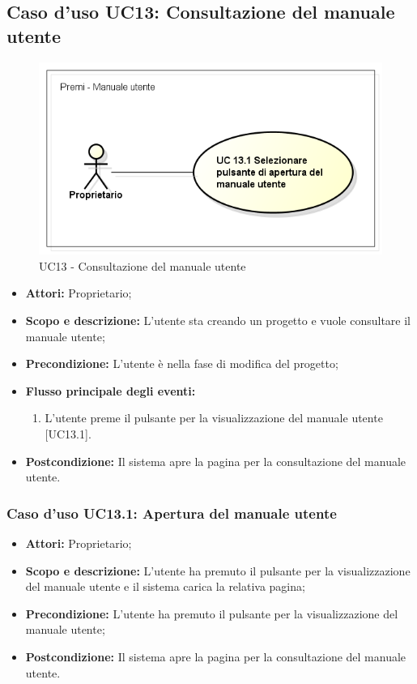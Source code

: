 \subsection{Caso d'uso UC13: Consultazione del manuale utente}
\begin{figure}[h] 
	\centering 
	\includegraphics[scale=0.45] {img/UC13.png}
	\caption{UC13 - Consultazione del manuale utente} 
\end{figure}

\begin{itemize}
	\item \textbf{Attori:} Proprietario;
	\item \textbf{Scopo e descrizione:} L'utente sta creando un progetto e vuole consultare il manuale utente;
	\item \textbf{Precondizione:} L'utente è nella fase di modifica del progetto;
	\item \textbf{Flusso principale degli eventi:}
	\begin{enumerate}
		\item L'utente preme il pulsante per la visualizzazione del manuale utente [UC13.1].
	\end{enumerate}
	\item \textbf{Postcondizione:} Il sistema apre la pagina per la consultazione del manuale utente.
\end{itemize}


\subsubsection{Caso d'uso UC13.1: Apertura del manuale utente}
\begin{itemize}
	\item \textbf{Attori:} Proprietario;
	\item \textbf{Scopo e descrizione:} L'utente ha premuto il pulsante per la visualizzazione del manuale utente e il sistema carica la relativa pagina;
	\item \textbf{Precondizione:} L'utente ha premuto il pulsante per la visualizzazione del manuale utente;
		\item \textbf{Postcondizione:} Il sistema apre la pagina per la consultazione del manuale utente.
	\end{itemize}